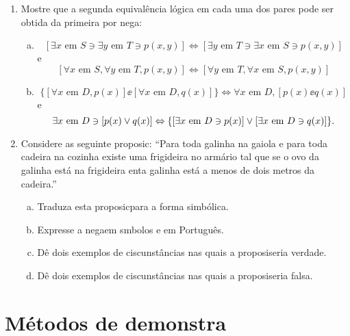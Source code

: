 \begin{enumerate}[{\bf 1.}]
\item Mostre que a segunda equival\^encia l\'ogica em cada uma dos pares pode ser obtida da primeira por nega\caoi: 
\begin{enumerate}[a)]
\item 
\[
[\exists x \textrm{ em } S \ni \exists y \textrm{ em } T \ni p(x,y)]\Leftrightarrow[\exists y \textrm{ em } T \ni \exists x \textrm{ em } S \ni p(x,y)]
\]
e
\[
[\forall x \textrm{ em } S, \forall y \textrm{ em } T, p(x,y)]\Leftrightarrow[\forall y \textrm{ em } T, \forall x \textrm{ em } S, p(x,y)]
\]

\item 
\[
\{[\forall x \textrm{ em } D, p(x)]\ee[\forall x \textrm{ em } D, q(x)]\}\Leftrightarrow \forall x \textrm{ em } D, [p(x)\ee q(x)]
\]
e
\[
\exists x \textrm{ em } D \ni [p(x)\vee q(x)]\Leftrightarrow\{[\exists x \textrm{ em } D \ni p(x)]\vee[\exists x \textrm{ em } D \ni q(x)]\}.
\]
\end{enumerate}

\item Considere as seguinte proposic\aoi: ``Para toda galinha na gaiola e para toda cadeira na cozinha existe uma frigideira no arm\'ario tal que se o ovo da galinha est\'a na frigideira ent\ao a galinha est\'a a menos de dois metros da cadeira.''
\begin{enumerate}[a)]
\item Traduza esta proposic\ao para a forma simb\'olica.
\item Expresse a nega\cao em s\ih mbolos e em Portugu\^es.
\item D\^e dois exemplos de ciscunst\^ancias nas quais a proposi\cao seria verdade.
\item D\^e dois exemplos de ciscunst\^ancias nas quais a proposi\cao seria falsa.
\end{enumerate}
\end{enumerate}

\section{M\'etodos de demonstra\cao}\label{metdem}


